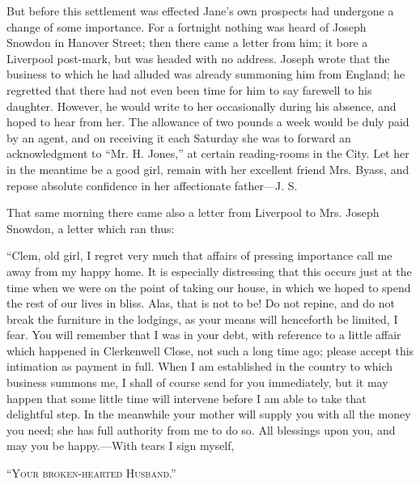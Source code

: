 But before this settlement was effected Jane's own prospects had
undergone a change of some importance. For a fortnight nothing was heard
of Joseph Snowdon in Hanover {}Street; then there came a letter from
him; it bore a Liverpool post-mark, but was headed with no address.
Joseph wrote that the business to which he had alluded was already
summoning him from England; he regretted that there had not even been
time for him to say farewell to his daughter. However, he would write to
her occasionally during his absence, and hoped to hear from her. The
allowance of two pounds a week would be duly paid by an agent, and on
receiving it each Saturday she was to forward an acknowledgment to ``Mr.
H. Jones,'' at certain reading-rooms in the City. Let her in the
meantime be a good girl, remain with her excellent friend Mrs. Byass,
and repose absolute confidence in her affectionate father---J. S.

That same morning there came also a letter from Liverpool to Mrs. Joseph
Snowdon, a letter which ran thus:

``Clem, old girl, I regret very much that affairs of pressing importance
call me away from my happy home. It is especially distressing that this
occurs just at the time when we {}were on the point of taking our house,
in which we hoped to spend the rest of our lives in bliss. Alas, that is
not to be! Do not repine, and do not break the furniture in the
lodgings, as your means will henceforth be limited, I fear. You will
remember that I was in your debt, with reference to a little affair
which happened in Clerkenwell Close, not such a long time ago; please
accept this intimation as payment in full. When I am established in the
country to which business summons me, I shall of course send for you
immediately, but it may happen that some little time will intervene
before I am able to take that delightful step. In the meanwhile your
mother will supply you with all the money you need; she has full
authority from me to do so. All blessings upon you, and may you be
happy.---With tears I sign myself,

\textsc{``Your broken-hearted Husband.''}{⁠}


